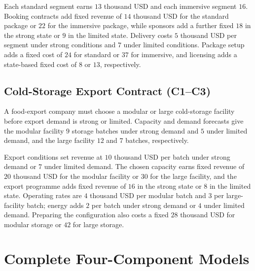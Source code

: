 	Each standard segment earns \(13\) thousand USD and each immersive segment \(16\). Booking contracts add fixed revenue of \(14\) thousand USD for the standard package or \(22\) for the immersive package, while sponsors add a further fixed \(18\) in the strong state or \(9\) in the limited state. Delivery costs \(5\) thousand USD per segment under strong conditions and \(7\) under limited conditions. Package setup adds a fixed cost of \(24\) for standard or \(37\) for immersive, and licensing adds a state-based fixed cost of \(8\) or \(13\), respectively.

	\subsection{Cold-Storage Export Contract (C1--C3)}
	\label{sec:problem18-cold-storage-export-contract-c1-c3}

	A food-export company must choose a modular or large cold-storage facility before export demand is strong or limited. Capacity and demand forecasts give the modular facility \(9\) storage batches under strong demand and \(5\) under limited demand, and the large facility \(12\) and \(7\) batches, respectively.

	Export conditions set revenue at \(10\) thousand USD per batch under strong demand or \(7\) under limited demand. The chosen capacity earns fixed revenue of \(20\) thousand USD for the modular facility or \(30\) for the large facility, and the export programme adds fixed revenue of \(16\) in the strong state or \(8\) in the limited state. Operating rates are \(4\) thousand USD per modular batch and \(3\) per large-facility batch; energy adds \(2\) per batch under strong demand or \(4\) under limited demand. Preparing the configuration also costs a fixed \(28\) thousand USD for modular storage or \(42\) for large storage.

	\section{Complete Four-Component Models}
	\label{sec:complete-four-component-models}


